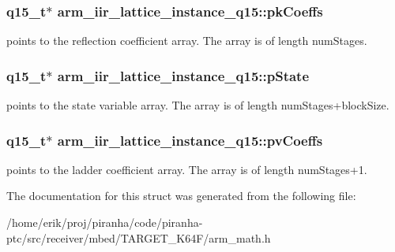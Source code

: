 \subsubsection[{\texorpdfstring{pk\+Coeffs}{pkCoeffs}}]{\setlength{\rightskip}{0pt plus 5cm}q15\+\_\+t$\ast$ arm\+\_\+iir\+\_\+lattice\+\_\+instance\+\_\+q15\+::pk\+Coeffs}\hypertarget{structarm__iir__lattice__instance__q15_a41c214a1ec38d4a82fae8899d715dd29}{}\label{structarm__iir__lattice__instance__q15_a41c214a1ec38d4a82fae8899d715dd29}
points to the reflection coefficient array. The array is of length num\+Stages. 
\subsubsection[{\texorpdfstring{p\+State}{pState}}]{\setlength{\rightskip}{0pt plus 5cm}q15\+\_\+t$\ast$ arm\+\_\+iir\+\_\+lattice\+\_\+instance\+\_\+q15\+::p\+State}\hypertarget{structarm__iir__lattice__instance__q15_afd0136ab917b529554d93f41a5e04618}{}\label{structarm__iir__lattice__instance__q15_afd0136ab917b529554d93f41a5e04618}
points to the state variable array. The array is of length num\+Stages+block\+Size. 
\subsubsection[{\texorpdfstring{pv\+Coeffs}{pvCoeffs}}]{\setlength{\rightskip}{0pt plus 5cm}q15\+\_\+t$\ast$ arm\+\_\+iir\+\_\+lattice\+\_\+instance\+\_\+q15\+::pv\+Coeffs}\hypertarget{structarm__iir__lattice__instance__q15_a4c4f57f45b223abbe2a9fb727bd2cad9}{}\label{structarm__iir__lattice__instance__q15_a4c4f57f45b223abbe2a9fb727bd2cad9}
points to the ladder coefficient array. The array is of length num\+Stages+1. 

The documentation for this struct was generated from the following file\+:\begin{DoxyCompactItemize}
\item 
/home/erik/proj/piranha/code/piranha-\/ptc/src/receiver/mbed/\+T\+A\+R\+G\+E\+T\+\_\+\+K64\+F/arm\+\_\+math.\+h\end{DoxyCompactItemize}
